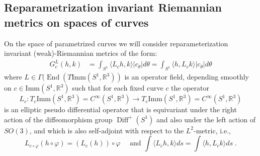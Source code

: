 \documentclass[12pt]{amsart}
\newcommand{\rev}[1]{#1}
\theoremstyle{definition}
\newcommand{\Diffp}{\operatorname{Diff}^+(S^1)}
\newcommand{\Imm}{\mathrm{Imm}}
\def\Ga{\Gamma}
\let\on=\operatorname
\begin{document}
\subsection*{Reparametrization invariant Riemannian metrics on spaces of curves}
On the space of parametrized curves we will consider reparameterization invariant (weak)-Riemannian metrics of the form:
\begin{align}
  G_c^L(h,k)&= \int_{S^1} \langle L_c h,k\rangle |c_\theta| d\theta=\int_{S^1} \langle h,L_ck\rangle |c_\theta| d\theta
\end{align}
where $ L \in \Gamma(\on{End}(T\Imm(S^1,\mathbb R^3))$ is an operator field, \rev{depending smoothly on $c\in \Imm(S^1,\mathbb R^3)$ such that for each fixed curve $c$} the operator 
\begin{equation}
 L_c:T_c\Imm(S^1,\mathbb R^3)=C^\infty(S^1,\mathbb R^3) \to T_c\Imm(S^1,\mathbb R^3)=C^\infty(S^1,\mathbb R^3)   
\end{equation}
is an elliptic pseudo differential operator that is equivariant under the right action of the diffeomorphism group $\Diffp$ and also under the left action of  $SO(3)$, and which is also self-adjoint with respect to the $L^2$-metric, i.e.,
\begin{equation}
L_{c\circ\varphi}(h\circ\varphi)=(L_c(h))\circ\varphi \quad \text{ and }
\int \langle L_c h, k\rangle ds = \int \langle h , L_c k\rangle ds\;.
\end{equation}
\end{document}
